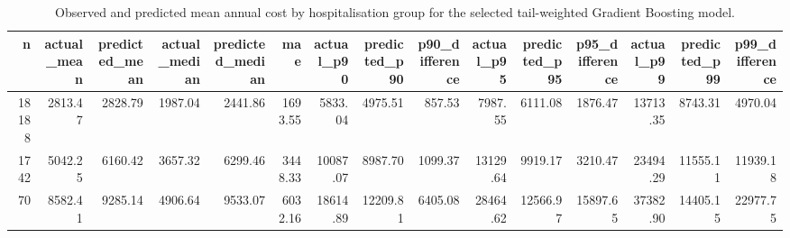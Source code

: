 \begin{table}
\caption{Observed and predicted mean annual cost by hospitalisation group for the selected tail-weighted Gradient Boosting model.}
\label{tab:06-selected-mean-group-summary-hospitalisation}
\begin{tabular}{rrrrrrrrrrrrrrr}
\toprule
n & actual_mean & predicted_mean & actual_median & predicted_median & mae & actual_p90 & predicted_p90 & p90_difference & actual_p95 & predicted_p95 & p95_difference & actual_p99 & predicted_p99 & p99_difference \\
\midrule
18188 & 2813.47 & 2828.79 & 1987.04 & 2441.86 & 1693.55 & 5833.04 & 4975.51 & 857.53 & 7987.55 & 6111.08 & 1876.47 & 13713.35 & 8743.31 & 4970.04 \\
1742 & 5042.25 & 6160.42 & 3657.32 & 6299.46 & 3448.33 & 10087.07 & 8987.70 & 1099.37 & 13129.64 & 9919.17 & 3210.47 & 23494.29 & 11555.11 & 11939.18 \\
70 & 8582.41 & 9285.14 & 4906.64 & 9533.07 & 6032.16 & 18614.89 & 12209.81 & 6405.08 & 28464.62 & 12566.97 & 15897.65 & 37382.90 & 14405.15 & 22977.75 \\
\bottomrule
\end{tabular}
\end{table}
